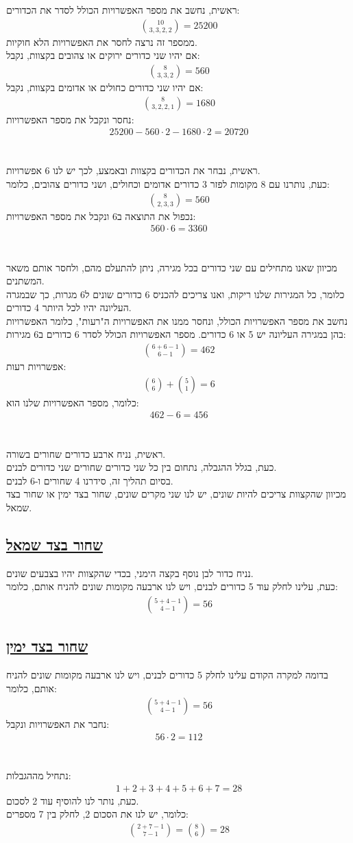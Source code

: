 \documentclass[a4paper, 12pt, leqno]{article}
\newcommand{\sub}[1]{\subsection{\underline{#1}}}
\newcommand{\eq}[1]{\begin{align*}#1\end{align*}}
\begin{document}
\section{}
ראשית, נחשב את מספר האפשרויות הכולל לסדר את הכדורים:
\eq{
    \binom{10}{3,3,2,2}=25200
}
ממספר זה נרצה לחסר את האפשרויות הלא חוקיות.\\
אם יהיו שני כדורים ירוקים או צהובים בקצוות, נקבל:
\eq{
    \binom{8}{3,3,2}=560
}
אם יהיו שני כדורים כחולים או אדומים בקצוות, נקבל:
\eq{
    \binom{8}{3,2,2,1}=1680
}
נחסר ונקבל את מספר האפשרויות:
\eq{
    25200-560\cdot2-1680\cdot2=20720
}

\section{}
ראשית, נבחר את הכדורים בקצוות ובאמצע, לכך יש לנו $6$ אפשרויות.\\
כעת, נותרנו עם 8 מקומות לפזר 3 כדורים אדומים וכחולים, ושני כדורים צהובים, כלומר:
\eq{
    \binom{8}{2,3,3}=560
}
נכפול את התוצאה ב6 ונקבל את מספר האפשרויות:
\eq{
    560\cdot6=3360
}

\pagebreak
\section{}
מכיוון שאנו מתחילים עם שני כדורים בכל מגירה, ניתן להתעלם מהם, ולחסר אותם משאר המשתנים.\\
כלומר, כל המגירות שלנו ריקות, ואנו צריכים להכניס 6 כדורים שונים ל6 מגרות, כך שבמגרה העליונה יהיו לכל היותר 4 כדורים.\\
נחשב את מספר האפשרויות הכולל, ונחסר ממנו את האפשרויות ה"רעות", כלומר האפשרויות בהן במגירה העליונה יש 5 או 6 כדורים.
מספר האפשרויות הכולל לסדר 6 כדורים ב6 מגירות:
\eq{
    \binom{6+6-1}{6-1}=462
}
אפשרויות רעות:
\eq{
    \binom{6}{6}+\binom{5}{1}=6
}
כלומר, מספר האפשרויות שלנו הוא:
\eq{
    462-6=456
}

\section{}
ראשית, נניח ארבע כדורים שחורים בשורה.\\
כעת, בגלל ההגבלה, נתחום בין כל שני כדורים שחורים שני כדורים לבנים.\\
בסיום תהליך זה, סידרנו 4 שחורים ו-6 לבנים.\\
מכיוון שהקצוות צריכים להיות שונים, יש לנו שני מקרים שונים, שחור בצד ימין או שחור בצד שמאל.
\sub{שחור בצד שמאל}
נניח כדור לבן נוסף בקצה הימני, בכדי שהקצוות יהיו בצבעים שונים.\\
כעת, עלינו לחלק עוד 5 כדורים לבנים, ויש לנו ארבעה מקומות שונים להניח אותם, כלומר:
\eq{
    \binom{5+4-1}{4-1}=56
}
\sub{שחור בצד ימין}
בדומה למקרה הקודם
עלינו לחלק 5 כדורים לבנים, ויש לנו ארבעה מקומות שונים להניח אותם, כלומר:
\eq{
    \binom{5+4-1}{4-1}=56
}
נחבר את האפשרויות ונקבל:
\eq{
    56\cdot2=112
}

\section{}
נתחיל מההגבלות:
\eq{
    1+2+3+4+5+6+7=28
}
כעת, נותר לנו להוסיף עוד 2 לסכום.\\
כלומר, יש לנו את הסכום 2, לחלק בין 7 מספרים:
\eq{
    \binom{2+7-1}{7-1}=\binom{8}{6}=28
}

\end{document}
